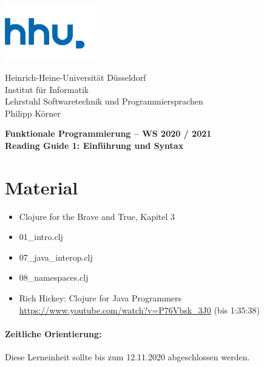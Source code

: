 \documentclass[11pt,a4paper]{article}
\theoremstyle{break}
\begin{document}
\begin{minipage}[b]{\textwidth}
\parbox[t]{5cm}{%
\includegraphics[width=4cm]{unilogo}
\hfill
}
\parbox[b]{11cm}{%
Heinrich-Heine-Universit\"at D\"usseldorf\\
Institut f\"ur Informatik\\
Lehrstuhl Softwaretechnik und Programmiersprachen\\
Philipp K\"orner
}

\end{minipage}
\begin{center}
\bf
Funktionale Programmierung -- WS 2020 / 2021\\
Reading Guide 1: Einf\"uhrung und Syntax
\end{center}

\pagestyle{empty}


\section{Material} 

\begin{itemize}
\item Clojure for the Brave and True, Kapitel 3
\item 01\_intro.clj
\item 07\_java\_interop.clj
\item 08\_namespaces.clj
\item Rich Hickey: Clojure for Java Programmers \url{https://www.youtube.com/watch?v=P76Vbsk_3J0} (bis 1:35:38)
\end{itemize}

\paragraph{Zeitliche Orientierung:} Diese Lerneinheit sollte bis zum 12.11.2020 abgeschlossen werden.
\end{document}
